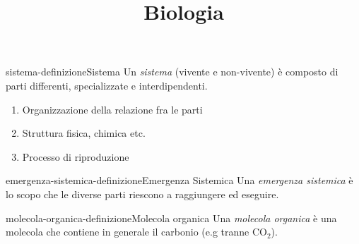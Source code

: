 \documentclass[preview]{standalone}
\begin{document}
\title{Biologia}
\genpage

\begin{snippetdefinition}{sistema-definizione}{Sistema}
    Un \textit{sistema} (vivente e non-vivente) è composto di parti differenti, specializzate e interdipendenti. 
    
    \begin{enumerate}
        \item Organizzazione della relazione fra le parti
        \item Struttura fisica, chimica etc. 
        \item Processo di riproduzione
    \end{enumerate}
\end{snippetdefinition}

\begin{snippetdefinition}{emergenza-sistemica-definizione}{Emergenza Sistemica}
    Una \textit{emergenza sistemica} è lo scopo che le diverse parti riescono a raggiungere ed eseguire.
\end{snippetdefinition}


\begin{snippetdefinition}{molecola-organica-definizione}{Molecola organica}
    Una \textit{molecola organica} è una molecola che contiene in generale il carbonio (e.g tranne CO\({}_2\)).
\end{snippetdefinition}
\end{document}
